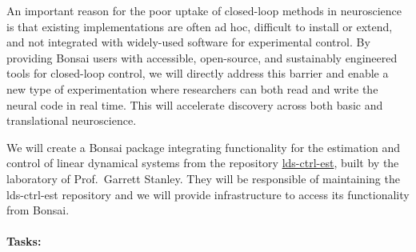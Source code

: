 An important reason for the poor uptake of closed-loop methods in neuroscience
is that existing implementations are often ad hoc, difficult to install or
extend, and not integrated with widely-used software for experimental control.
By providing Bonsai users with accessible, open-source, and sustainably
engineered tools for closed-loop control, we will directly address this barrier
and enable a new type of experimentation where researchers can both read and
write the neural code in real time. This will accelerate discovery across both
basic and translational neuroscience.

We will create a Bonsai package integrating functionality for the estimation
and control of linear dynamical systems from the repository
\href{https://github.com/CLOCTools/lds-ctrl-est}{lds-ctrl-est}, built by the
laboratory of Prof.~Garrett Stanley.
%
They will be responsible of maintaining the lds-ctrl-est repository and we will
provide infrastructure to access its functionality from Bonsai.

\paragraph{Tasks:}\mbox{}\\


